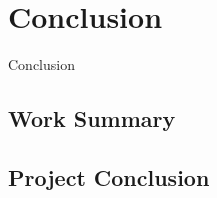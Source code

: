 \chapter{Conclusion}\label{chap:concl}

Conclusion

\section{Work Summary}\label{sec:c1}

\section{Project Conclusion}\label{sec:c2}
